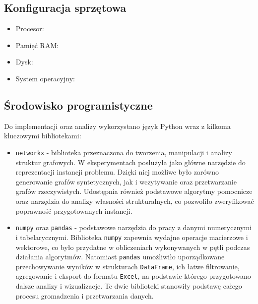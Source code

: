 \subsection{Konfiguracja sprzętowa}
\begin{itemize}
    \item Procesor:
    \item Pamięć RAM:
    \item Dysk:
    \item System operacyjny:
\end{itemize}

\subsection{Środowisko programistyczne}

Do implementacji oraz analizy wykorzystano język Python wraz z kilkoma kluczowymi bibliotekami:

\begin{itemize}
    \item \texttt{networkx} - biblioteka przeznaczona do tworzenia, manipulacji i analizy struktur grafowych.
    W eksperymentach posłużyła jako główne narzędzie do reprezentacji instancji problemu.
    Dzięki niej możliwe było zarówno generowanie grafów syntetycznych,
    jak i wczytywanie oraz przetwarzanie grafów rzeczywistych.
    Udostępnia również podstawowe algorytmy pomocnicze oraz narzędzia do analizy własności strukturalnych,
    co pozwoliło zweryfikować poprawność przygotowanych instancji.

    \item \texttt{numpy} oraz \texttt{pandas} - podstawowe narzędzia do pracy z danymi numerycznymi i tabelarycznymi.
    Biblioteka \texttt{numpy} zapewnia wydajne operacje macierzowe i wektorowe, co było przydatne w obliczeniach wykonywanych w pętli podczas działania algorytmów.
    Natomiast \texttt{pandas} umożliwiło uporządkowane przechowywanie wyników w strukturach \texttt{DataFrame},
    ich łatwe filtrowanie, agregowanie i eksport do formatu \texttt{Excel},
    na podstawie którego przygotowano dalsze analizy i wizualizacje.
    Te dwie biblioteki stanowiły podstawę całego procesu gromadzenia i przetwarzania danych.

\end{itemize}


